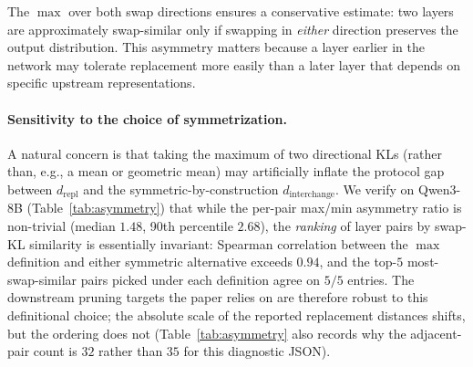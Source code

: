 \documentclass{article}
\begin{document}
\noindent The $\max$ over both swap directions ensures a conservative estimate: two layers are approximately swap-similar only if swapping in \emph{either} direction preserves the output distribution. This asymmetry matters because a layer earlier in the network may tolerate replacement more easily than a later layer that depends on specific upstream representations.

\paragraph{Sensitivity to the choice of symmetrization.}
A natural concern is that taking the maximum of two directional KLs (rather than, e.g., a mean or geometric mean) may artificially inflate the protocol gap between $d_{\text{repl}}$ and the symmetric-by-construction $d_{\text{interchange}}$. We verify on Qwen3-8B (Table~\ref{tab:asymmetry}) that while the per-pair max/min asymmetry ratio is non-trivial (median $1.48$, 90th percentile $2.68$), the \emph{ranking} of layer pairs by swap-KL similarity is essentially invariant: Spearman correlation between the $\max$ definition and either symmetric alternative exceeds $0.94$, and the top-$5$ most-swap-similar pairs picked under each definition agree on $5/5$ entries. The downstream pruning targets the paper relies on are therefore robust to this definitional choice; the absolute scale of the reported replacement distances shifts, but the ordering does not (Table~\ref{tab:asymmetry} also records why the adjacent-pair count is $32$ rather than $35$ for this diagnostic JSON).


\end{document}
